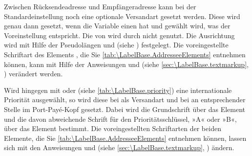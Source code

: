 \BeginIndexGroup
{} Zwischen
Rücksendeadresse und Empfängeradresse kann bei der Standardeinstellung
 noch
eine optionale Versandart gesetzt werden. Diese wird genau
dann gesetzt, wenn die Variable  einen 
hat und
%
 gewählt wird, was der Voreinstellung
entspricht. Die  von  wird durch
 nicht genutzt. Die Ausrichtung wird mit Hilfe der
Pseudolängen  und
 (siehe
) festgelegt. Die
voreingestellte Schriftart des Elements
, die Sie
\autoref{tab:\LabelBase.AddresseeElements} entnehmen können, kann mit Hilfe
der Anweisungen  und
 (siehe
\autoref{sec:\LabelBase.textmarkup}, )
verändert werden.%
\EndIndexGroup

\BeginIndexGroup
{}%
%
Wird%
 hingegen mit
 oder  (siehe
\autoref{tab:\LabelBase.priority}) eine internationale Priorität ausgewählt,
so wird diese bei  als Versandart und bei
 an entsprechender Stelle im Port-Payé-Kopf
gesetzt. Dabei wird die
Grundschrift über das Element  und die
davon abweichende Schrift für den Prioritätsschlüssel, »A« oder »B«, über das
Element  bestimmt. Die voreingestellten Schriftarten
der beiden Elemente, die Sie \autoref{tab:\LabelBase.AddresseeElements}
entnehmen können, lassen sich mit den Anweisungen
 und
 (siehe
\autoref{sec:\LabelBase.textmarkup}, )
ändern.%
\EndIndexGroup

